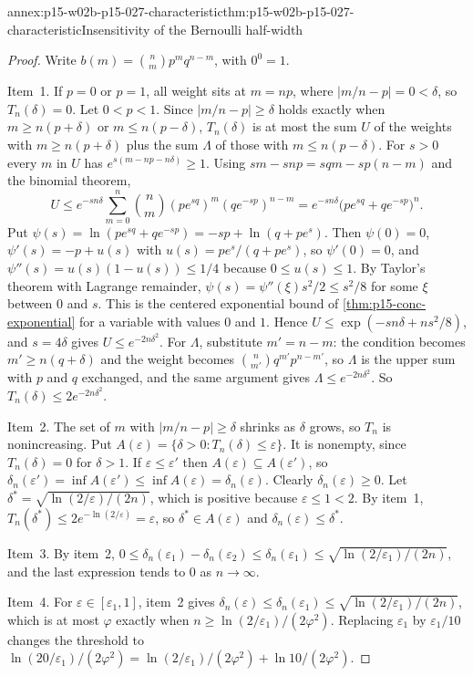 \begin{annexitem}{annex:p15-w02b-p15-027-characteristic}{thm:p15-w02b-p15-027-characteristic}{Insensitivity of the Bernoulli half-width}
\begin{proof}
Write \(b(m)=\binom{n}{m}p^mq^{n-m}\), with \(0^0=1\).

Item~1. If \(p=0\) or \(p=1\), all weight sits at \(m=np\), where
\(|m/n-p|=0<\delta\), so \(T_n(\delta)=0\). Let \(0<p<1\). Since
\(|m/n-p|\geq\delta\) holds exactly when \(m\geq n(p+\delta)\) or
\(m\leq n(p-\delta)\), \(T_n(\delta)\) is at most the sum \(U\) of the
weights with \(m\geq n(p+\delta)\) plus the sum \(\Lambda\) of those with
\(m\leq n(p-\delta)\). For \(s>0\) every \(m\) in \(U\) has
\(e^{s(m-np-n\delta)}\geq1\). Using \(sm-snp=sqm-sp(n-m)\) and the binomial
theorem,
\[
 U\leq e^{-sn\delta}\sum_{m=0}^n\binom{n}{m}(pe^{sq})^m(qe^{-sp})^{n-m}
 =e^{-sn\delta}\bigl(pe^{sq}+qe^{-sp}\bigr)^n .
\]
Put \(\psi(s)=\ln(pe^{sq}+qe^{-sp})=-sp+\ln(q+pe^s)\). Then
\(\psi(0)=0\), \(\psi'(s)=-p+u(s)\) with \(u(s)=pe^s/(q+pe^s)\), so
\(\psi'(0)=0\), and \(\psi''(s)=u(s)(1-u(s))\leq1/4\) because
\(0\leq u(s)\leq1\). By Taylor's theorem with Lagrange remainder,
\(\psi(s)=\psi''(\xi)s^2/2\leq s^2/8\) for some \(\xi\) between \(0\) and
\(s\). This is the centered exponential bound of
\cref{thm:p15-conc-exponential} for a variable with values \(0\) and
\(1\). Hence \(U\leq\exp(-sn\delta+ns^2/8)\), and \(s=4\delta\) gives
\(U\leq e^{-2n\delta^2}\). For \(\Lambda\), substitute \(m'=n-m\): the
condition becomes \(m'\geq n(q+\delta)\) and the weight becomes
\(\binom{n}{m'}q^{m'}p^{n-m'}\), so \(\Lambda\) is the upper sum with
\(p\) and \(q\) exchanged, and the same argument gives
\(\Lambda\leq e^{-2n\delta^2}\). So \(T_n(\delta)\leq2e^{-2n\delta^2}\).

Item~2. The set of \(m\) with \(|m/n-p|\geq\delta\) shrinks as \(\delta\)
grows, so \(T_n\) is nonincreasing. Put
\(A(\varepsilon)=\{\delta>0:T_n(\delta)\leq\varepsilon\}\). It is
nonempty, since \(T_n(\delta)=0\) for \(\delta>1\). If
\(\varepsilon\leq\varepsilon'\) then \(A(\varepsilon)\subseteq A(\varepsilon')\),
so \(\delta_n(\varepsilon')=\inf A(\varepsilon')\leq\inf A(\varepsilon)=\delta_n(\varepsilon)\).
Clearly \(\delta_n(\varepsilon)\geq0\). Let
\(\delta^*=\sqrt{\ln(2/\varepsilon)/(2n)}\), which is positive because
\(\varepsilon\leq1<2\). By item~1,
\(T_n(\delta^*)\leq2e^{-\ln(2/\varepsilon)}=\varepsilon\), so
\(\delta^*\in A(\varepsilon)\) and \(\delta_n(\varepsilon)\leq\delta^*\).

Item~3. By item~2,
\(0\leq\delta_n(\varepsilon_1)-\delta_n(\varepsilon_2)\leq\delta_n(\varepsilon_1)
\leq\sqrt{\ln(2/\varepsilon_1)/(2n)}\), and the last expression tends to
\(0\) as \(n\to\infty\).

Item~4. For \(\varepsilon\in[\varepsilon_1,1]\), item~2 gives
\(\delta_n(\varepsilon)\leq\delta_n(\varepsilon_1)\leq\sqrt{\ln(2/\varepsilon_1)/(2n)}\),
which is at most \(\varphi\) exactly when
\(n\geq\ln(2/\varepsilon_1)/(2\varphi^2)\). Replacing \(\varepsilon_1\) by
\(\varepsilon_1/10\) changes the threshold to
\(\ln(20/\varepsilon_1)/(2\varphi^2)=\ln(2/\varepsilon_1)/(2\varphi^2)+\ln10/(2\varphi^2)\).
\end{proof}
\end{annexitem}

